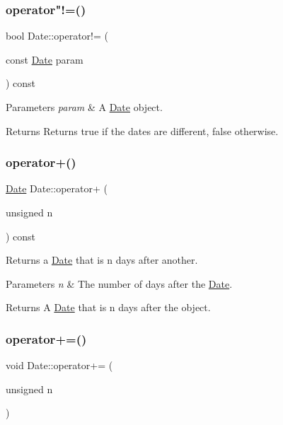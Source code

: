 \subsubsection{\texorpdfstring{operator"!=()}{operator!=()}}
{\footnotesize\ttfamily bool Date\+::operator!= (\begin{DoxyParamCaption}\item[{const \hyperlink{classDate}{Date}}]{param }\end{DoxyParamCaption}) const}


\begin{DoxyParams}{Parameters}
{\em param} & A \hyperlink{classDate}{Date} object. \\
\hline
\end{DoxyParams}
\begin{DoxyReturn}{Returns}
Returns true if the dates are different, false otherwise. 
\end{DoxyReturn}
\mbox{\label{classDate_a95ee06bbb5f83cc57bee03224296dcc8}} 
\subsubsection{\texorpdfstring{operator+()}{operator+()}}
{\footnotesize\ttfamily \hyperlink{classDate}{Date} Date\+::operator+ (\begin{DoxyParamCaption}\item[{unsigned}]{n }\end{DoxyParamCaption}) const}



Returns a \hyperlink{classDate}{Date} that is n days after another. 


\begin{DoxyParams}{Parameters}
{\em n} & The number of days after the \hyperlink{classDate}{Date}. \\
\hline
\end{DoxyParams}
\begin{DoxyReturn}{Returns}
A \hyperlink{classDate}{Date} that is n days after the object. 
\end{DoxyReturn}
\mbox{\label{classDate_a3d72b37493c4e6393b72a5945d405a61}} 
\subsubsection{\texorpdfstring{operator+=()}{operator+=()}}
{\footnotesize\ttfamily void Date\+::operator+= (\begin{DoxyParamCaption}\item[{unsigned}]{n }\end{DoxyParamCaption})}




